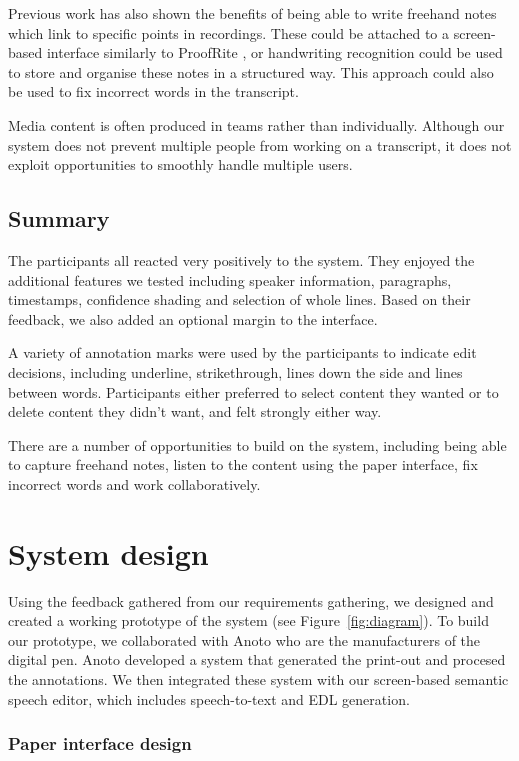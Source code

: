 Previous work has also shown the benefits of being able to write freehand notes which link to specific points in
recordings. These could be attached to a screen-based interface similarly to ProofRite \citep{Conroy2004}, or
handwriting recognition could be used to store and organise these notes in a structured way. This approach could also
be used to fix incorrect words in the transcript.

Media content is often produced in teams rather than individually.  Although our system does not prevent multiple
people from working on a transcript, it does not exploit opportunities to smoothly handle multiple users.

\subsection{Summary}
The participants all reacted very positively to the system. They enjoyed the additional features we tested including
speaker information, paragraphs, timestamps, confidence shading and selection of whole lines. Based on their feedback,
we also added an optional margin to the interface.

A variety of annotation marks were used by the participants to indicate edit decisions, including underline,
strikethrough, lines down the side and lines between words.  Participants either preferred to select content they
wanted or to delete content they didn't want, and felt strongly either way.

There are a number of opportunities to build on the system, including being able to capture freehand notes, listen to
the content using the paper interface, fix incorrect words and work collaboratively.

\section{System design}\label{sec:paper-design}
Using the feedback gathered from our requirements gathering, we designed and created a working prototype of the system
(see Figure~\ref{fig:diagram}). To build our prototype, we collaborated with Anoto who are the manufacturers of the
digital pen. Anoto developed a system that generated the print-out and procesed the annotations. We then integrated
these system with our screen-based semantic speech editor, which includes speech-to-text and EDL generation.

\subsubsection{Paper interface design}

